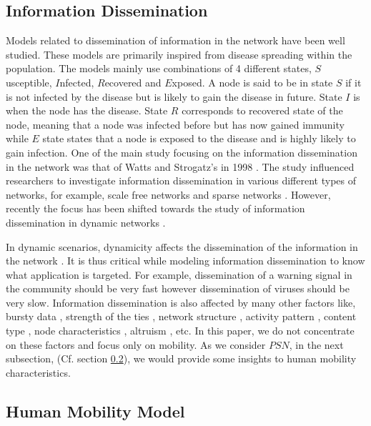 \documentclass[preprint, twocolumn,5p]{elsarticle}
\begin{document}
    \subsection{Information Dissemination}\label{subsec:spreading}
    Models related to dissemination of information in the network have been well studied. These models are primarily inspired from disease spreading within the population. The models mainly use combinations of 4 different states, $S$usceptible, $I$nfected, $R$ecovered and $E$xposed. A node is said to be in state $S$ if it is not infected by the disease but is likely to gain the disease in future. State $I$ is when the node has the disease. State $R$ corresponds to recovered state of the node, meaning that a node was infected before but has now gained immunity while $E$ state states that a node is exposed to the disease and is highly likely to gain infection. One of the main study focusing on the information dissemination in the network was that of Watts and Strogatz's in 1998 \cite{Watts1998}. The study influenced researchers to investigate information dissemination in various different types of networks, for example, scale free networks \cite{PastorSatorras2001,Santos2005} and sparse networks \cite{Pettarin2011}. However, recently the focus has been shifted towards the study of information dissemination in dynamic networks \cite{Kivela2012,Clementi2008,Prakash2010,Schwarzkopf2010,Valler2011,Dutta2011,Clementi2011,Clementi2012}.

    In dynamic scenarios, dynamicity affects the dissemination of the information in the network \cite{Kivela2012}. It is thus critical while modeling information dissemination to know what application is targeted. For example, dissemination of a warning signal in the community should be very fast however dissemination of viruses should be very slow. Information dissemination is also affected by many other factors like, bursty data \cite{Karsai2011}, strength of the ties \cite{Miritello2011}, network structure \cite{Nicosia2011}, activity pattern \cite{Vazquez2007}, content type \cite{Wang2009}, node characteristics \cite{Wang2011a}, altruism \cite{Hui2009}, etc. In this paper, we do not concentrate on these factors and focus only on mobility. As we consider $PSN$, in the next subsection, (Cf. section \ref{subsec:mobility}), we would provide some insights to human mobility characteristics.

    \subsection{Human Mobility Model}\label{subsec:mobility}
\end{document}
